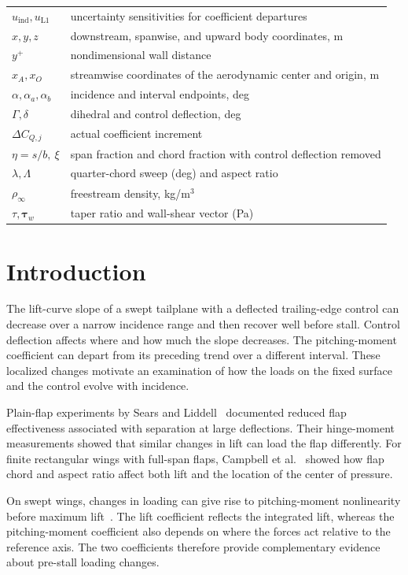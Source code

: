 \documentclass[journal]{new-aiaa}
\begin{document}
\begin{longtable*}{@{}l@{\quad=\quad}>{\raggedright\arraybackslash}p{.77\linewidth}@{}}
$u_{\mathrm{ind}},u_{\mathrm{L1}}$ & uncertainty sensitivities for coefficient departures \\
$x,y,z$ & downstream, spanwise, and upward body coordinates, m \\
$y^+$ & nondimensional wall distance \\
$x_A,x_O$ & streamwise coordinates of the aerodynamic center and origin, m \\
$\alpha,\alpha_a,\alpha_b$ & incidence and interval endpoints, deg \\
$\Gamma,\delta$ & dihedral and control deflection, deg \\
$\Delta C_{Q,j}$ & actual coefficient increment \\
$\eta=s/b,\ \xi$ & span fraction and chord fraction with control deflection removed \\
$\lambda,\Lambda$ & quarter-chord sweep (deg) and aspect ratio \\
$\rho_\infty$ & freestream density, kg/m$^3$ \\
$\tau,\boldsymbol\tau_w$ & taper ratio and wall-shear vector (Pa) \\
\end{longtable*}
\setcounter{table}{0}

\section{Introduction}\label{sec:intro}
The lift-curve slope of a swept tailplane with a deflected trailing-edge control can decrease over a narrow incidence range and then recover well before stall. Control deflection affects where and how much the slope decreases. The pitching-moment coefficient can depart from its preceding trend over a different interval. These localized changes motivate an examination of how the loads on the fixed surface and the control evolve with incidence.

Plain-flap experiments by Sears and Liddell~\cite{sears1942plain} documented reduced flap effectiveness associated with separation at large deflections. Their hinge-moment measurements showed that similar changes in lift can load the flap differently. For finite rectangular wings with full-span flaps, Campbell et al.~\cite{campbell1956fullspan} showed how flap chord and aspect ratio affect both lift and the location of the center of pressure.

On swept wings, changes in loading can give rise to pitching-moment nonlinearity before maximum lift~\cite{harper1964sweptstall}. The lift coefficient reflects the integrated lift, whereas the pitching-moment coefficient also depends on where the forces act relative to the reference axis. The two coefficients therefore provide complementary evidence about pre-stall loading changes.
\end{document}
